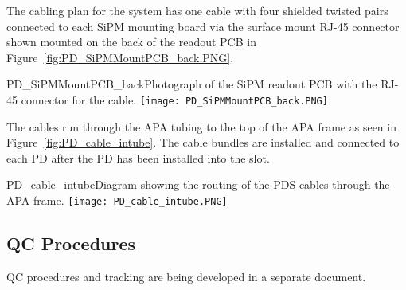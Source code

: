 
The cabling plan for the system has one cable with four shielded twisted pairs 
connected to each SiPM mounting board via the surface mount RJ-45 connector
shown mounted on the back of the readout PCB in 
Figure~\ref{fig:PD_SiPMMountPCB_back.PNG}.  
\begin{cdrfigure}
  {PD_SiPMMountPCB_back}{Photograph of the SiPM readout PCB with the 
    RJ-45 connector for the cable.}
\texttt{[image: PD\_SiPMMountPCB\_back.PNG]}
\end{cdrfigure}
The cables run through the APA tubing to the top of the APA frame as seen
in Figure~\ref{fig:PD_cable_intube}.
The cable bundles are installed and connected to each PD 
after the PD has been installed into the slot.
\begin{cdrfigure}
  {PD_cable_intube}{Diagram showing the routing of the PDS cables
    through the APA frame.}
\texttt{[image: PD\_cable\_intube.PNG]}
\end{cdrfigure}



\subsection{QC Procedures}
QC procedures and tracking are being developed in a separate document.



